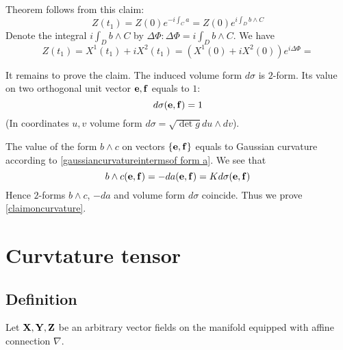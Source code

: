 \documentclass[12pt]{article}
\theoremstyle{theorem}
\numberwithin{equation}{section}
\begin{document}
{Theorem follows from this claim:
           \begin{equation}\label{complexrotation2}
      Z(t_1)=Z(0)e^{-i\int_C a}=Z(0)e^{i\int_D b\wedge C}
   \end{equation}
Denote the integral ${i\int_D b\wedge C}$ by $\Delta \Phi\colon \Delta \Phi={i\int_D b\wedge C}$. We have
           \begin{equation}\label{complexrotation2}
      Z(t_1)=X^1(t_1)+iX^2(t_1)=\left(X^1(0)+iX^2(0)\right)e^{i\Delta\Phi}=
   \end{equation}

\medskip

 It remains to prove the claim.  The induced volume form $d\sigma$ is $2$-form. Its value
 on two orthogonal unit vector ${\bf e},{\bf f}$ equals to $1$:
              \begin{equation}\label{valueonorthonormalvectors}
                d\sigma ({\bf e},{\bf f})=1
              \end{equation}
(In coordinates $u,v$ volume form $d\sigma=\sqrt{\det g}du\wedge dv$).

The value of the form $b\wedge c$ on vectors $\{{\bf e},{\bf f}\}$ equals to Gaussian curvature according to \eqref{gaussiancurvatureintermsof form a}.
We see that
             $$
        b\wedge c({\bf e},{\bf f})=-da({\bf e},{\bf f})=K d\sigma ({\bf e},{\bf f})
             $$
Hence $2$-forms $b\wedge c$, $-da$ and volume form $d\sigma$ coincide. Thus we prove \eqref{claimoncurvature}.


\section {Curvtature tensor}

\subsection {Definition}

Let ${\bf X},{\bf Y},{\bf Z}$ be an arbitrary vector fields on the manifold equipped with affine connection  $\nabla$.

}
\end{document}
